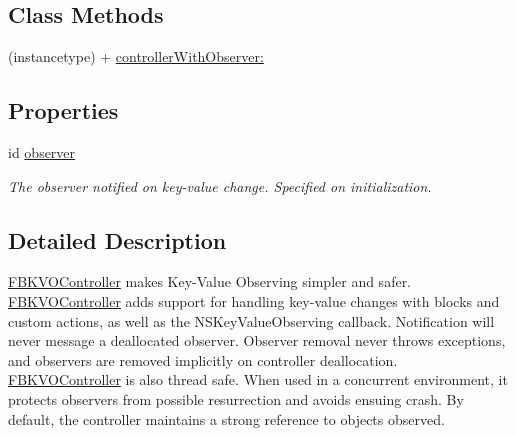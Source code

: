 \subsection*{Class Methods}
\begin{DoxyCompactItemize}
\item 
(instancetype) + \hyperlink{interface_f_b_k_v_o_controller_ab8b4b15ecd54384a02f19db9fc284176}{controller\+With\+Observer\+:}
\end{DoxyCompactItemize}
\subsection*{Properties}
\begin{DoxyCompactItemize}
\item 
\hypertarget{interface_f_b_k_v_o_controller_a9a41b9bcda267b904af88265fa4c3611}{id \hyperlink{interface_f_b_k_v_o_controller_a9a41b9bcda267b904af88265fa4c3611}{observer}}\label{interface_f_b_k_v_o_controller_a9a41b9bcda267b904af88265fa4c3611}

\begin{DoxyCompactList}\small\item\em The observer notified on key-\/value change. Specified on initialization. \end{DoxyCompactList}\end{DoxyCompactItemize}


\subsection{Detailed Description}
\hyperlink{interface_f_b_k_v_o_controller}{F\+B\+K\+V\+O\+Controller} makes Key-\/\+Value Observing simpler and safer.  \hyperlink{interface_f_b_k_v_o_controller}{F\+B\+K\+V\+O\+Controller} adds support for handling key-\/value changes with blocks and custom actions, as well as the N\+S\+Key\+Value\+Observing callback. Notification will never message a deallocated observer. Observer removal never throws exceptions, and observers are removed implicitly on controller deallocation. \hyperlink{interface_f_b_k_v_o_controller}{F\+B\+K\+V\+O\+Controller} is also thread safe. When used in a concurrent environment, it protects observers from possible resurrection and avoids ensuing crash. By default, the controller maintains a strong reference to objects observed. 

